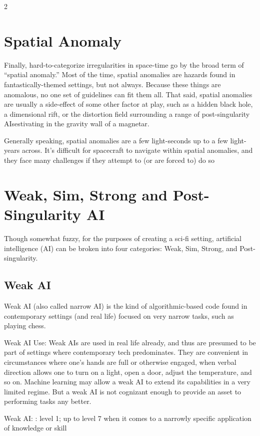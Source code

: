\begin{multicols}{2}
\chapter{Spatial Anomaly}

Finally, hard-to-categorize irregularities in space-time go by the broad term of “spatial anomaly.” Most of the time, spatial anomalies are hazards found in fantastically-themed settings, but not always. Because these things are anomalous, no one set of guidelines can fit them all. That said, spatial anomalies are usually a side-effect of some other factor at play, such as a hidden black hole, a dimensional rift, or the distortion field surrounding a range of post-singularity AIsestivating in the gravity wall of a magnetar.

Generally speaking, spatial anomalies are a few light-seconds up to a few light-years across. It’s difficult for spacecraft to navigate within spatial anomalies, and they face many challenges if they attempt to (or are forced to) do so

\chapter{Weak, Sim, Strong and Post-Singularity AI}

Though somewhat fuzzy, for the purposes of creating a sci-fi setting, artificial intelligence (AI) can be broken into four categories: Weak, Sim, Strong, and Post-singularity.
	
\section{Weak AI}

Weak AI (also called narrow AI) is the kind of algorithmic-based code found in contemporary settings (and real life) focused on very narrow tasks, such as playing chess.

Weak AI Use: Weak AIs are used in real life already, and thus are presumed to be part of settings where contemporary tech predominates. They are convenient in circumstances where one’s hands are full or otherwise engaged, when verbal direction allows one to turn on a light, open a door, adjust the temperature, and so on. Machine learning may allow a weak AI to extend its capabilities in a very limited regime. But a weak AI is not cognizant enough to provide an asset to performing tasks any better. 

Weak AI: : level 1; up to level 7 when it comes to a narrowly specific application of knowledge or skill


\end{multicols}
